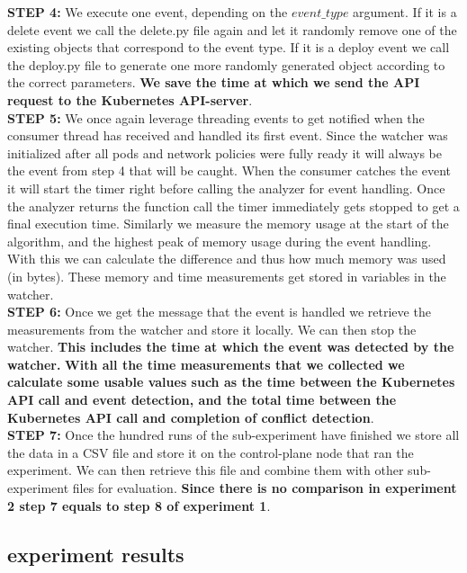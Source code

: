 \textbf{STEP 4:} We execute one event, depending on the $event\_type$ argument. If it is a delete event we call the delete.py file again and let it randomly remove one of the existing objects that correspond to the event type. If it is a deploy event we call the deploy.py file to generate one more randomly generated object according to the correct parameters. \textbf{We save the time at which we send the API request to the Kubernetes API-server}.
\\[10pt]

\textbf{STEP 5:} We once again leverage threading events to get notified when the consumer thread has received and handled its first event. Since the watcher was initialized after all pods and network policies were fully ready it will always be the event from step 4 that will be caught. When the consumer catches the event it will start the timer right before calling the analyzer for event handling. Once the analyzer returns the function call the timer immediately gets stopped to get a final execution time. Similarly we measure the memory usage at the start of the algorithm, and the highest peak of memory usage during the event handling. With this we can calculate the difference and thus how much memory was used (in bytes). These memory and time measurements get stored in variables in the watcher.
\\[10pt]

\textbf{STEP 6:} Once we get the message that the event is handled we retrieve the measurements from the watcher and store it locally. We can then stop the watcher. 
\textbf{This includes the time at which the event was detected by the watcher.} \textbf{With all the time measurements that we collected we calculate some usable values such as the time between the Kubernetes API call and event detection, and the total time between the Kubernetes API call and completion of conflict detection}.
\\[10pt]

\textbf{STEP 7:} Once the hundred runs of the sub-experiment have finished we store all the data in a CSV file and store it on the control-plane node that ran the experiment. We can then retrieve this file and combine them with other sub-experiment files for evaluation.  \textbf{Since there is no comparison in experiment 2 step 7 equals to step 8 of experiment 1}. 
\\[10pt]


\subsection{experiment results} \label{exp2:results}

\cleardoublepage
